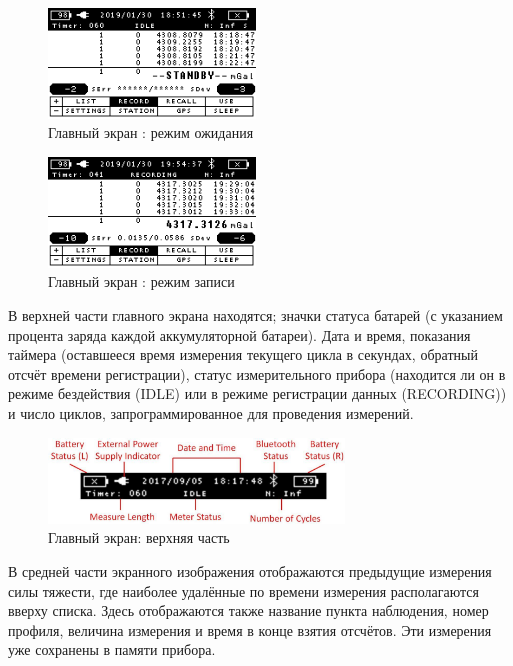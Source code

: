 \begin{figure}[h]
  \centering
  \includegraphics[width=0.49\textwidth]{figures/cg6_autograv_main_screen_idle_mode}
  \caption{Главный экран \cg{}: режим ожидания}
  \label{fig:cg6_autograv_main_screen_idle_mode}
\end{figure}

\begin{figure}[h]
  \centering
  \includegraphics[width=0.49\textwidth]{figures/cg6_autograv_main_screen_recording_mode}
  \caption{Главный экран \cg{}: режим записи}
  \label{fig:cg6_autograv_main_screen_recording_mode}
\end{figure}

В верхней части главного экрана находятся; значки статуса батарей (с указанием
процента заряда каждой аккумуляторной батареи). Дата и время, показания таймера
(оставшееся время измерения текущего цикла в секундах, обратный отсчёт времени
регистрации), статус измерительного прибора (находится ли он в режиме
бездействия (IDLE) или в режиме регистрации данных (RECORDING)) и число циклов,
запрограммированное для проведения измерений.

\begin{figure}[h]
  \centering
  \includegraphics[width=0.7\textwidth]{figures/main_screen_upper_part}
  \caption{Главный экран: верхняя часть}
  \label{fig:main_screen_upper_part}
\end{figure}

В средней части экранного изображения отображаются предыдущие измерения силы
тяжести, где наиболее удалённые по времени измерения располагаются вверху
списка. Здесь отображаются также название пункта наблюдения, номер профиля,
величина измерения и время в конце взятия отсчётов. Эти измерения уже сохранены
в памяти прибора.

